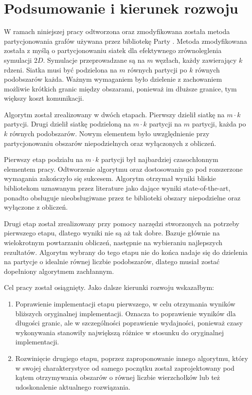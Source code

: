 \newpage
\section{Podsumowanie i kierunek rozwoju}

W ramach niniejszej pracy odtworzona oraz zmodyfikowana została metoda partycjonowania grafów używana przez
bibliotekę Party \cite{1364754}.
Metoda zmodyfikowana została z myślą o partycjonowaniu siatek dla efektywnego zrównoleglenia symulacji 2$D$.
Symulacje przeprowadzane są na $m$ węzłach, każdy zawierający $k$ rdzeni.
Siatka musi być podzielona na $m$ równych partycji po $k$ równych podobszarów każda.
Ważnym wymaganiem było dzielenie z zachowaniem możliwie krótkich granic między obszarami, ponieważ im dłuższe granice,
tym większy koszt komunikacji.

Algorytm został zrealizowany w dwóch etapach.
Pierwszy dzielił siatkę na $m \cdot k$ partycji.
Drugi dzielił siatkę podzieloną na $m \cdot k$ partycji na $m$ partycji, każda po $k$ równych podobszarów.
Nowym elementem było uwzględnienie przy partycjonowaniu obszarów niepodzielnych oraz wyłączonych
z obliczeń.

Pierwszy etap podziału na $m \cdot k$ partycji był najbardziej czasochłonnym elementem pracy.
Odtworzenie algorytmu oraz dostosowaniu go pod rozszerzone wymagania zakończyło się sukcesem.
Algorytm otrzymał wyniki bliskie bibliotekom uznawanym przez literature jako dające wyniki state-of-the-art,
ponadto obsługuje nieobsługiwane przez te biblioteki obszary niepodzielne oraz wyłączone z obliczeń.

Drugi etap został zrealizowany przy pomocy narzędzi stworzonych na potrzeby pierwszego etapu, dlatego wyniki nie są
aż tak dobre.
Bazuje głównie na wielokrotnym powtarzaniu obliczeń, następnie na wybieraniu najlepszych rezultatów.
Algorytm wybrany do tego etapu nie do końca nadaje się do dzielenia na partycje o idealnie równej liczbie podobszarów,
dlatego musiał zostać dopełniony algorytmem zachłannym.

Cel pracy został osiągnięty.
Jako dalsze kierunki rozwoju wskazałbym:
\begin{enumerate}
    \item {Poprawienie implementacji etapu pierwszego, w celu otrzymania wyników bliższych oryginalnej implementacji.
    Oznacza to poprawienie wyników dla długości granic, ale w szczególności poprawienie wydajności,
    ponieważ czasy wykonywania stanowiły największą różnice w stosunku do oryginalnej implementacji.}
    \item {Rozwinięcie drugiego etapu, poprzez zaproponowanie innego algorytmu, który w swojej charakterystyce
    od samego początku został zaprojektowany pod kątem otrzymywania obszarów o równej liczbie wierzchołków lub też
    udoskonalenie aktualnego rozwiązania.}
\end{enumerate}
